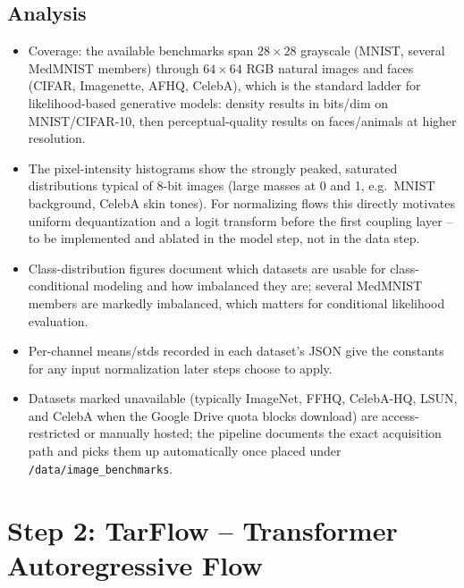 \documentclass[11pt]{article}
\begin{document}
\subsection{Analysis}
\begin{itemize}
  \item Coverage: the available benchmarks span $28\times28$ grayscale
        (MNIST, several MedMNIST members) through $64\times64$ RGB natural
        images and faces (CIFAR, Imagenette, AFHQ, CelebA), which is the
        standard ladder for likelihood-based generative models: density
        results in bits/dim on MNIST/CIFAR-10, then perceptual-quality
        results on faces/animals at higher resolution.
  \item The pixel-intensity histograms show the strongly peaked, saturated
        distributions typical of 8-bit images (large masses at 0 and 1,
        e.g.\ MNIST background, CelebA skin tones). For normalizing flows
        this directly motivates uniform dequantization and a logit
        transform before the first coupling layer -- to be implemented and
        ablated in the model step, not in the data step.
  \item Class-distribution figures document which datasets are usable for
        class-conditional modeling and how imbalanced they are; several
        MedMNIST members are markedly imbalanced, which matters for
        conditional likelihood evaluation.
  \item Per-channel means/stds recorded in each dataset's JSON give the
        constants for any input normalization later steps choose to apply.
  \item Datasets marked unavailable (typically ImageNet, FFHQ, CelebA-HQ,
        LSUN, and CelebA when the Google Drive quota blocks download) are
        access-restricted or manually hosted; the pipeline documents the
        exact acquisition path and picks them up automatically once placed
        under \texttt{/data/image\_benchmarks}.
\end{itemize}

\section{Step 2: TarFlow -- Transformer Autoregressive Flow}
\label{sec:step2}
\end{document}
